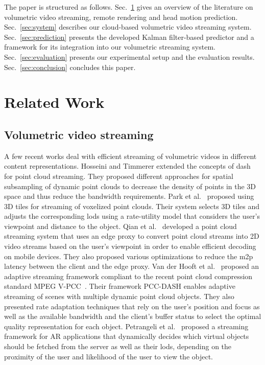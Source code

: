\documentclass[sigconf]{acmart}			%
\begin{document}
The paper is structured as follows. 
Sec.~\ref{sec:background} gives an overview of the literature on volumetric video streaming, remote rendering and head motion prediction.
Sec.~\ref{sec:system} describes our cloud-based volumetric video streaming system.
Sec.~\ref{sec:prediction} presents the developed Kalman filter-based predictor and a framework for its integration into our volumetric streaming system.
Sec.~\ref{sec:evaluation} presents our experimental setup and the evaluation results. 
Sec.~\ref{sec:conclusion} concludes this paper.

\section{Related Work}
\label{sec:background}

\subsection{Volumetric video streaming}
\label{sec:volumetric}
A few recent works deal with efficient streaming of volumetric videos in different content representations.
Hosseini and Timmerer \cite{hosseini2018} extended the concepts of \gls{dash} for point cloud streaming. They proposed different approaches for spatial subsampling of dynamic point clouds to decrease the density of points in the 3D space and thus reduce the bandwidth requirements. 
Park et al.~\cite{park2019} proposed using 3D tiles for streaming of voxelized point clouds.
Their system selects 3D tiles and adjusts the corresponding \glspl{lod} using a rate-utility model that considers the user's viewpoint and distance to the object. 
Qian et al.~\cite{qian2019} developed a point cloud streaming system that uses an edge proxy to convert point cloud streams into 2D video streams based on the user's viewpoint in order to enable efficient decoding on mobile devices. 
They also proposed various optimizations to reduce the \gls{m2p} latency between the client and the edge proxy.
Van der Hooft et al.~\cite{vanderHooft2019} proposed an adaptive streaming framework compliant to the recent point cloud compression standard MPEG V-PCC~\cite{schwarz2019}. 
Their framework PCC-DASH enables adaptive streaming of scenes with multiple dynamic point cloud objects.
They also presented rate adaptation techniques that rely on the user's position and focus as well as the available bandwidth and the client's buffer status to select the optimal quality representation for each object.
Petrangeli et al.~\cite{petrangeli2019} proposed a streaming framework for AR applications that dynamically decides which virtual objects should be fetched from the server as well as their \glspl{lod}, depending on the proximity of the user and likelihood of the user to view the object.
\end{document}
